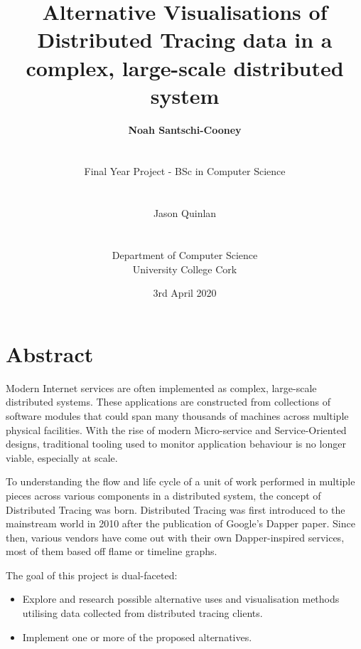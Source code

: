 \documentclass[12pt,pdftex,titlepage]{report}
\author{\textbf{Noah Santschi-Cooney}
\\\\\\\small{Final Year Project - BSc in Computer Science}
\\\\\\\small{Jason Quinlan}
\\\\\\\small{Department of Computer Science}
\\\small{University College Cork}}
\title{\textbf{Alternative Visualisations of Distributed Tracing data in a complex, large-scale distributed system}}
\date{\vfill\small{3rd April 2020}}
\begin{document}
    \maketitle    

    \chapter*{Abstract}
        Modern Internet services are often implemented as complex, large-scale distributed systems. These applications are constructed from collections 
        of software modules that could span many thousands of machines across multiple physical facilities. With the rise of modern Micro-service and 
        Service-Oriented designs, traditional tooling used to monitor application behaviour is no longer viable, especially at scale. 
        
        To understanding the flow and life cycle of a unit of work performed in multiple pieces across various components in a distributed system, the concept of 
        Distributed Tracing was born. Distributed Tracing was first introduced to the mainstream world in 2010 after the publication of Google’s Dapper
        paper. Since then, various vendors have come out with their own Dapper-inspired services, most of them based off flame or timeline graphs. 
        
        The goal of this project is dual-faceted:
        \begin{itemize}
            \item Explore and research possible alternative uses and visualisation methods utilising data collected from distributed tracing clients.
            \item Implement one or more of the proposed alternatives.
        \end{itemize}
\end{document}
